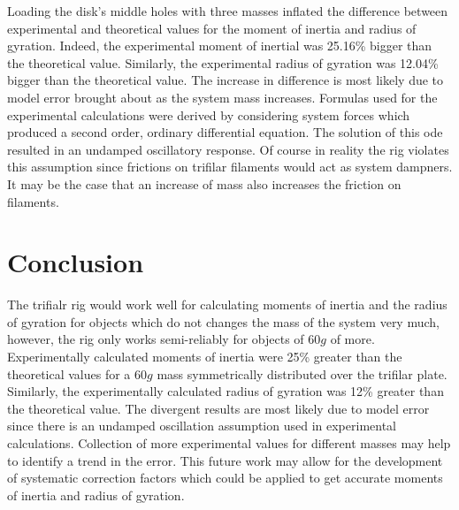 \documentclass[a4paper]{article}
\begin{document}
Loading the disk's middle holes with three masses inflated the difference between experimental and theoretical values for the moment of inertia and radius of gyration. Indeed, the experimental moment of inertial was 25.16\% bigger than the theoretical value. Similarly, the experimental radius of gyration was 12.04\% bigger than the theoretical value. The increase in difference is most likely due to model error brought about as the system mass increases. Formulas used for the experimental calculations were derived by considering system forces which produced a second order, ordinary differential equation. The solution of this ode resulted in an undamped oscillatory response. Of course in reality the rig violates this assumption since frictions on trifilar filaments would act as system dampners. It may be the case that an increase of mass also increases the friction on filaments. 

\section{Conclusion}
The trifialr rig would work well for calculating moments of inertia and the radius of gyration for objects which do not changes the mass of the system very much, however, the rig only works semi-reliably for objects of 60$\si{g}$ of more. Experimentally calculated moments of inertia were 25\% greater than the theoretical values for a 60$\si{g}$ mass symmetrically distributed over the trifilar plate. Similarly, the experimentally calculated radius of gyration was 12\% greater than the theoretical value. The divergent results are most likely due to model error since there is an undamped oscillation assumption used in experimental calculations. Collection of more experimental values for different masses may help to identify a trend in the error. This future work may allow for the development of systematic correction factors which could be applied to get accurate moments of inertia and radius of gyration.     



\end{document}

